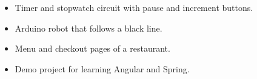 \begin{footnotesize}
\end{footnotesize}


\divider




\begin{itemize}

\item Timer and stopwatch circuit with pause and increment buttons.

\end{itemize}

\begin{footnotesize}
\end{footnotesize}


\divider




\begin{itemize}

\item Arduino robot that follows a black line.

\end{itemize}

\begin{footnotesize}
\end{footnotesize}


\divider




\begin{itemize}

\item Menu and checkout pages of a restaurant.

\item Demo project for learning Angular and Spring.

\end{itemize}

\begin{footnotesize}
\end{footnotesize}










